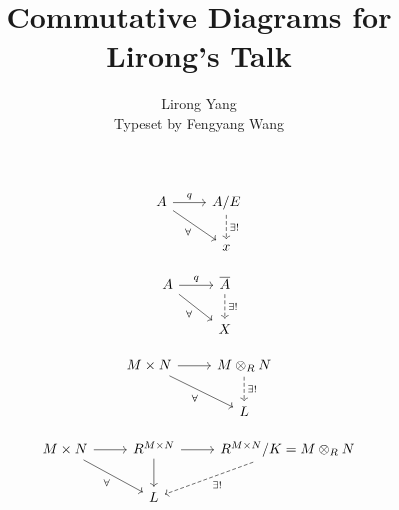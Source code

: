 \documentclass{article}
\title{Commutative Diagrams for Lirong's Talk}
\author{Lirong Yang\\Typeset by Fengyang Wang}
\begin{document}
\maketitle

\[
\begin{tikzcd}
  A \arrow[rd, "\forall" below left] \arrow[r, "q"] & A/E \arrow[d, "\exists!", dashed] \\
  & x
\end{tikzcd}
\]

\[
\begin{tikzcd}
  A \arrow[rd, "\forall" below left] \arrow[r, "q"] & \overline{A} \arrow[d, "\exists!", dashed] \\
  & X
\end{tikzcd}
\]

\[
\begin{tikzcd}
  M\times N \arrow[r] \arrow[rd, "\forall" below left ] &
  M \otimes_R N \arrow[d, "\exists!", dashed]\\
  & L
\end{tikzcd}
\]

\[
\begin{tikzcd}
  M\times N \arrow[r] \arrow[rd, "\forall" below left] &
  R^{M\times N} \arrow[r] \arrow[d] &
  R^{M\times N}/K = M \otimes_R N \arrow[ld, "\exists!", dashed] \\
  & L &
\end{tikzcd}
\]
\end{document}
